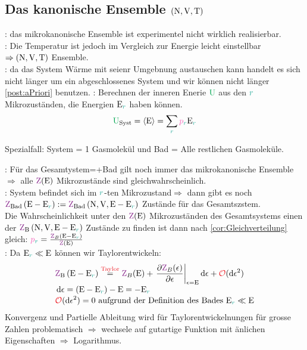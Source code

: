 \subsection{Das kanonische Ensemble $(\mathrm{N},\mathrm{V},\mathrm{T})$}
\label{subsec:kanonischeEnsemble}
\begin{sectionbox}[Problem]\nospacing
  \begin{wrapfigure}{r}{0.4\linewidth}	
  \end{wrapfigure}
  : das mikrokanonische Ensemble ist experimentel nicht
  wirklich realisierbar.\\
    : Die Temperatur ist jedoch im Vergleich zur Energie
    leicht einstellbar $\Rightarrow (\mathrm{N},\mathrm{V},\mathrm{T})$ Ensemble.\\
    : da das System Wärme mit seienr Umgebnung austauschen kann handelt es sich nicht länger um ein abgeschlossenes
    System und wir können nicht länger \cref{post:aPriori} benutzen.
    : Berechnen der inneren Enerie $\Upot$ aus den $\idxr$ Mikrozuständen, die  Energien $\Ezr$
    haben können.
    \[\Upot_{\text{Syst}}=\obs{\Ez}=\sum_{\idxr}\pbr\Ezr\]
\end{sectionbox}
\begin{notebox}[Nebenbemerkung]
  Spezialfall: System = 1 Gasmolekül und Bad = Alle restlichen Gasmoleküle.
\end{notebox}
\begin{sectionbox}\nospacing
    : Für das Gesamtystem=+Bad gilt noch immer das mikrokanonische Ensemble$\Rightarrow$ alle $\Zz(\Ez)$
    Mikrozustände sind gleichwahrscheinlich.\\
    : System befindet sich im $\idxr$-ten Mikrozustand$\Rightarrow$ dann gibt es noch
    $\Zz_{\text{Bad}}\left(\Ez-\Ezr\right):=\Zz_{\text{Bad}}\left(\Nz,\Vz,\Ez-\Ezr\right)$ Zustände für das Gesamtszstem.\\
    Die Wahrscheinlichkeit unter den $\Zz(\Ez)$ Mikrozuständen des Gesamtsystems einen der
    $\Zz_{\text{B}}\left(\Nz,\Vz,\Ez-\Ezr\right)$ Zustände zu finden ist dann nach \cref{cor:Gleichverteilung} gleich: $\pbr=\frac{\Zz_B(\Ez-\Ezr)}{\Zz(\Ez)}$\\
    : Da $\Ezr\ll\Ez$ können wir Taylorentwickeln:
    \begin{align*}
      &\Zz_{\text{B}}\left(\Ez-\Ezr\right)\stackrel{\text{\rd{Taylor}}}{=}\Zz_B(\Ez)+\left.\pfrac{\Zz_B(\epsilon)}{\epsilon}\right\vert_{\epsilon=\Ez}\diff\epsilon+\bigO{\diff\epsilon^2}\nalign
      &\diff\epsilon=(\Ez-\Ezr)-\Ez=-\Ezr\nalign
      &\bigO{\diff\epsilon^2}=0 \text{ aufgrund der Definition des Bades } \Ezr\ll\Ez
    \end{align*}
     Konvergenz und Partielle Ableitung wird für Taylorentwickelnungen für grosse Zahlen problematisch
    $\Rightarrow$ wechsele auf gutartige Funktion mit änlichen Eigenschaften $\Rightarrow$ Logarithmus.
\end{sectionbox}
